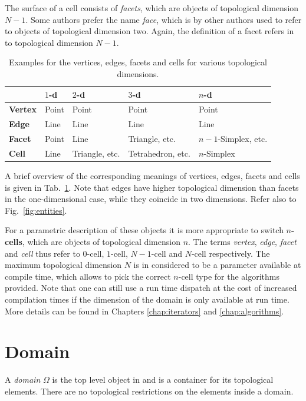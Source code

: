The surface of a cell consists of \emph{facets}, which are objects of topological dimension $N-1$. Some authors prefer the name \emph{face}, which is by other authors used to refer to objects of topological dimension two. Again, the definition of a facet refers in {\ViennaGrid} to topological dimension $N-1$.

\begin{table}[b]
 \centering 
 \renewcommand{\arraystretch}{1.3}
\begin{tabular}{|l|l|l|l|l|}
\hline
          &  $1$-d & $2$-d & $3$-d & $n$-d \\
\hline
 \textbf{Vertex}   & Point  & Point & Point & Point \\
 \textbf{Edge}     & Line   & Line  & Line  & Line \\
 \textbf{Facet}   & Point  & Line  & Triangle, etc. & $n-1$-Simplex, etc. \\
 \textbf{Cell}   & Line   & Triangle, etc. & Tetrahedron, etc. & $n$-Simplex \\
\hline
\end{tabular}
\caption{Examples for the vertices, edges, facets and cells for various topological dimensions.}
\label{tab:vertex-edge-facet-cell}
\end{table}

A brief overview of the corresponding meanings of vertices, edges, facets and cells is given in Tab.~\ref{tab:vertex-edge-facet-cell}. Note that edges have higher topological dimension than facets in the one-dimensional case, while they coincide in two dimensions. Refer also to Fig.~\ref{fig:entities}.

For a parametric description of these objects it is more appropriate to switch \textbf{$n$-cells}, which are objects of topological dimension $n$. The terms \emph{vertex}, \emph{edge}, \emph{facet} and \emph{cell} thus refer to $0$-cell, $1$-cell, $N-1$-cell and $N$-cell respectively. The maximum topological dimension $N$ is in {\ViennaGrid} considered to be a parameter available at compile time, which allows to pick the correct $n$-cell type for the algorithms provided. Note that one can still use a run time dispatch at the cost of increased compilation times if the dimension of the domain is only available at run time. More details can be found in Chapters \ref{chap:iterators} and \ref{chap:algorithms}.


\section{Domain}
A \emph{domain} $\Omega$ is the top level object in {\ViennaGrid} and is a container for its topological elements. There are no topological restrictions on the elements inside a domain. 

